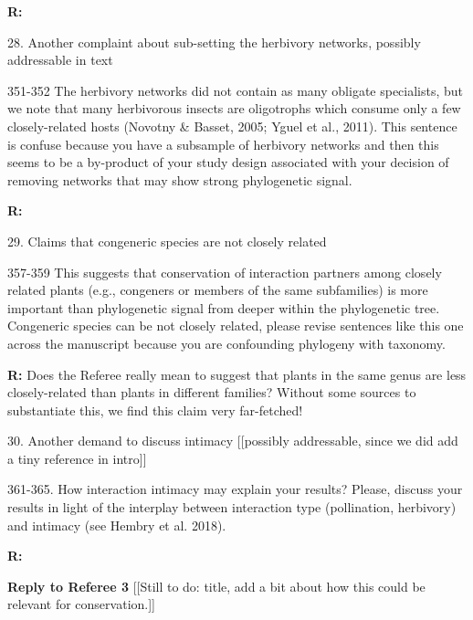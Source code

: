 \documentclass[12pt]{letter}
\newenvironment{refquote}{\bigskip \begin{it}}{\end{it}\smallskip}
\begin{document}
		\textbf{R:}


	28. Another complaint about sub-setting the herbivory networks, possibly addressable in text

		\begin{refquote}
			351-352 The herbivory networks did not contain as many obligate specialists, but we note that many herbivorous insects are oligotrophs which consume only a few closely-related hosts (Novotny & Basset, 2005; Yguel et al., 2011). This sentence is confuse because you have a subsample of herbivory networks and then this seems to be a by-product of your study design associated with your decision of removing networks that may show strong phylogenetic signal.
		\end{refquote}

		\textbf{R:} 


	29. Claims that congeneric species are not closely related

		\begin{refquote}
			357-359 This suggests that conservation of interaction partners among closely related plants (e.g., congeners or members of the same subfamilies) is more important than phylogenetic signal from deeper within the phylogenetic tree. Congeneric species can be not closely related, please revise sentences like this one across the manuscript because you are confounding phylogeny with taxonomy.
		\end{refquote}


		\textbf{R:} Does the Referee really mean to suggest that plants in the same genus are less closely-related than plants in different families? Without some sources to substantiate this, we find this claim very far-fetched!


	30. Another demand to discuss intimacy [[possibly addressable, since we did add a tiny reference in intro]]

		\begin{refquote}
			361-365. How interaction intimacy may explain your results? Please, discuss your results in light of the interplay between interaction type (pollination, herbivory) and intimacy (see Hembry et al. 2018).
		\end{refquote}


		\textbf{R:}


\clearpage

{\Large \bf Reply to Referee 3} [[Still to do: title, add a bit about how this could be relevant for conservation.]]
\end{document}
